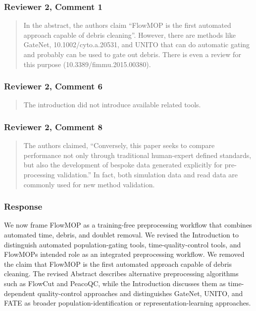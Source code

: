 \documentclass[
  11pt,
  a4paper,
]{article}
\begin{document}
\subsubsection{Reviewer 2, Comment 1}\label{reviewer-2-comment-1}

\begin{quote}
In the abstract, the authors claim ``FlowMOP is the first automated
approach capable of debris cleaning''. However, there are methods like
GateNet, 10.1002/cyto.a.20531, and UNITO that can do automatic gating
and probably can be used to gate out debris. There is even a review for
this purpose (10.3389/fimmu.2015.00380).
\end{quote}

\subsubsection{Reviewer 2, Comment 6}\label{reviewer-2-comment-6}

\begin{quote}
The introduction did not introduce available related tools.
\end{quote}

\subsubsection{Reviewer 2, Comment 8}\label{reviewer-2-comment-8}

\begin{quote}
The authors claimed, ``Conversely, this paper seeks to compare
performance not only through traditional human-expert defined standards,
but also the development of bespoke data generated explicitly for
pre-processing validation.'' In fact, both simulation data and read data
are commonly used for new method validation.
\end{quote}

\subsubsection{Response}\label{response}

We now frame FlowMOP as a training-free preprocessing workflow that
combines automated time, debris, and doublet removal. We revised the
Introduction to distinguish automated population-gating tools,
time-quality-control tools, and FlowMOP\textquotesingle s intended role
as an integrated preprocessing workflow. We removed the claim that
FlowMOP is the first automated approach capable of debris cleaning. The
revised Abstract describes alternative preprocessing algorithms such as
FlowCut and PeacoQC, while the Introduction discusses them as
time-dependent quality-control approaches and distinguishes GateNet,
UNITO, and FATE as broader population-identification or
representation-learning approaches.
\end{document}
